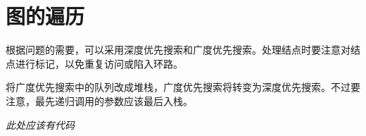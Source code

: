 \section{图的遍历}
	根据问题的需要，可以采用深度优先搜索和广度优先搜索。处理结点时要注意对结点进行标记，以免重复访问或陷入环路。
	
	将广度优先搜索中的队列改成堆栈，广度优先搜索将转变为深度优先搜索。不过要注意，最先递归调用的参数应该最后入栈。
	
	\emph{此处应该有代码}